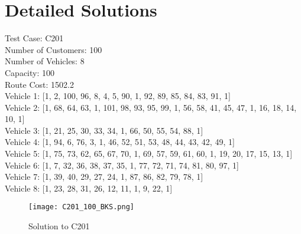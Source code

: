\appendix
\chapter{Detailed Solutions} \label{APP_A}
Test Case: C201 \\
Number of Customers: 100 \\
Number of Vehicles: 8 \\
Capacity: 100 \\
Route Cost: 1502.2 \\
Vehicle 1: [1, 2, 100, 96, 8, 4, 5, 90, 1, 92, 89, 85, 84, 83, 91, 1] \\
Vehicle 2: [1, 68, 64, 63, 1, 101, 98, 93, 95, 99, 1, 56, 58, 41, 45, 47, 1, 16, 18, 14, 10, 1] \\
Vehicle 3: [1, 21, 25, 30, 33, 34, 1, 66, 50, 55, 54, 88, 1] \\
Vehicle 4: [1, 94, 6, 76, 3, 1, 46, 52, 51, 53, 48, 44, 43, 42, 49, 1] \\
Vehicle 5: [1, 75, 73, 62, 65, 67, 70, 1, 69, 57, 59, 61, 60, 1, 19, 20, 17, 15, 13, 1] \\
Vehicle 6: [1, 7, 32, 36, 38, 37, 35, 1, 77, 72, 71, 74, 81, 80, 97, 1] \\
Vehicle 7: [1, 39, 40, 29, 27, 24, 1, 87, 86, 82, 79, 78, 1] \\
Vehicle 8: [1, 23, 28, 31, 26, 12, 11, 1, 9, 22, 1]

\begin{figure}
\centering
\texttt{[image: C201\_100\_BKS.png]}
\caption{Solution to C201}
\end{figure}